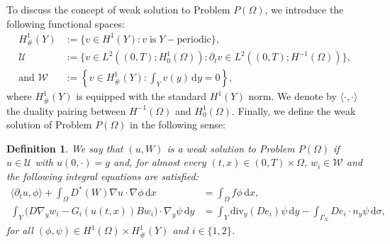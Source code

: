 \documentclass[11pt]{article}
\newtheorem{definition}{Definition}[section]
\newcommand{\timeint}{(0,T)}
\newcommand{\di}[1]{\,\mathrm{d}#1}
\begin{document}
    \par To discuss the concept of weak solution to Problem $P(\Omega)$, we introduce the following functional spaces:
%
\begin{align*}
H_{\#}^1(Y)&:=\{v\in H^1(Y): v \;\mbox{is}\; Y- \mbox{periodic}\},\\
    \mathcal{U}&:=\{v\in L^2(\timeint;H_0^{1}(\Omega)): \partial_t v\in L^2(\timeint;H^{-1}(\Omega))\},\\
    \text{and }\mathcal{W}&:=\left\{v\in H_{\#}^1(Y): \int_Yv(y)\di{y}=0\right\},
\end{align*}
%
where $H_{\#}^1(Y)$ is equipped with the standard $H^1(Y)$ norm.
We denote by $\langle\cdot,\cdot\rangle$ the duality pairing between $H^{-1}(\Omega)$ and $H_0^1(\Omega).$
Finally, we define the weak solution of Problem $P(\Omega)$ in the following sense:
%
\begin{definition}\label{D1}
We say that $(u,W)$ is a weak solution to Problem $P(\Omega)$ if $u\in\mathcal{U}$ with $u(0,\cdot) = g$ and, for almost every $(t,x)\in \timeint \times \Omega$, $w_i\in \mathcal{W}$ and the following integral equations are satisfied:
%
\begin{subequations}
\begin{align}
       \langle \partial_t u, \phi \rangle+\int_{\Omega} D^*(W) \nabla u \cdot\nabla \phi \di{x} &=  \int_{\Omega} f \phi \di{x},\label{wf}\\
       \int_{Y}\big(D\nabla_y w_i  - G_i(u(t,x))Bw_i\big)\cdot \nabla_y \psi\di{y}&=\int_{Y} \mathrm{div}_y( D e_i)\psi \di{y}-\int_{\Gamma_N} De_i\cdot n_y\psi \di{\sigma},\label{wfcell}
\end{align}
\end{subequations}
for all  $(\phi, \psi)\in H^1(\Omega)\times H_{\#}^1(Y)$ and $i\in\{1,2\}$.
\end{definition}
\end{document}
